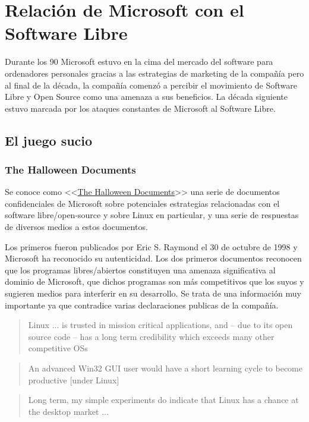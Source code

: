 \section{Relación de Microsoft con el Software Libre}
Durante los 90 Microsoft estuvo en la cima del mercado del software para ordenadores personales gracias a las estrategias de marketing de la compañía pero al final de la década, la compañía comenzó a percibir el movimiento de Software Libre y Open Source como una amenaza a sus beneficios. La década siguiente estuvo marcada por los ataques constantes de Microsoft al Software Libre.\cite{wiki_2020:microsoft_and_open_source}

\subsection{El juego sucio}
\subsubsection{The Halloween Documents}
Se conoce como <<\href{https://en.wikipedia.org/wiki/Halloween_documents}{The Halloween Documents}>> una serie de documentos confidenciales de Microsoft sobre potenciales estrategias relacionadas con el software libre/open-source y sobre Linux en particular, y una serie de respuestas de diversos medios a estos documentos.

Los primeros fueron publicados por Eric S. Raymond el 30 de octubre de 1998 y Microsoft ha reconocido su autenticidad. Los dos primeros documentos reconocen que los programas libres/abiertos constituyen una amenaza significativa al dominio de Microsoft, que dichos programas son más competitivos que los suyos y sugieren medios para interferir en su desarrollo. Se trata de una información muy importante ya que contradice varias declaraciones publicas de la compañía. \cite{wiki_2020:halloween_documents}

\begin{quote}
    Linux ... is trusted in mission critical applications, and – due to its open source code – has a long term credibility which exceeds many other competitive OSs
\end{quote}

\begin{quote}
    An advanced Win32 GUI user would have a short learning cycle to become productive [under Linux]
\end{quote}

\begin{quote}
    Long term, my simple experiments do indicate that Linux has a chance at the desktop market ...
\end{quote}

